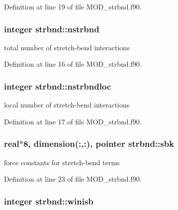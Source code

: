 Definition at line 19 of file M\-O\-D\-\_\-strbnd.\-f90.

\hypertarget{classstrbnd_a95508a01d4f20af68cf9d9223416a16f}{
\subsubsection[{nstrbnd}]{\setlength{\rightskip}{0pt plus 5cm}integer strbnd\-::nstrbnd}}\label{classstrbnd_a95508a01d4f20af68cf9d9223416a16f}


total number of stretch-\/bend interactions 



Definition at line 16 of file M\-O\-D\-\_\-strbnd.\-f90.

\hypertarget{classstrbnd_a73019a5225f63308e25165f0e7c5733d}{
\subsubsection[{nstrbndloc}]{\setlength{\rightskip}{0pt plus 5cm}integer strbnd\-::nstrbndloc}}\label{classstrbnd_a73019a5225f63308e25165f0e7c5733d}


local number of stretch-\/bend interactions 



Definition at line 17 of file M\-O\-D\-\_\-strbnd.\-f90.

\hypertarget{classstrbnd_adba63e55ee5880bdc3fc2ff2393bc48d}{
\subsubsection[{sbk}]{\setlength{\rightskip}{0pt plus 5cm}real$\ast$8, dimension(\-:,\-:), pointer strbnd\-::sbk}}\label{classstrbnd_adba63e55ee5880bdc3fc2ff2393bc48d}


force constants for stretch-\/bend terms 



Definition at line 23 of file M\-O\-D\-\_\-strbnd.\-f90.

\hypertarget{classstrbnd_a72cc543333b4b1d2f2db634e7d3f9827}{
\subsubsection[{winisb}]{\setlength{\rightskip}{0pt plus 5cm}integer strbnd\-::winisb}}\label{classstrbnd_a72cc543333b4b1d2f2db634e7d3f9827}


